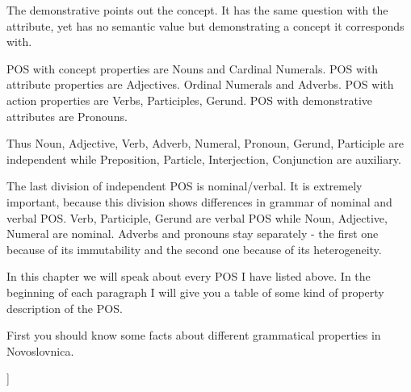 The demonstrative points out the concept. It has the same question with the attribute, yet has no semantic value but demonstrating a concept it corresponds with. 

POS with concept properties are Nouns and Cardinal Numerals. POS with attribute properties are Adjectives. Ordinal Numerals and Adverbs. POS with action properties are Verbs, Participles, Gerund. POS with demonstrative attributes are Pronouns.

Thus Noun, Adjective, Verb, Adverb, Numeral, Pronoun, Gerund, Participle are independent while Preposition, Particle, Interjection, Conjunction are auxiliary.

The last division of independent POS is nominal/verbal. It is extremely important, because this division shows differences in grammar of nominal and verbal POS. Verb, Participle, Gerund are verbal POS while Noun, Adjective, Numeral are nominal. Adverbs and pronouns stay separately - the first one because of its immutability and the second one because of its heterogeneity. 

In this chapter we will speak about every POS I have listed above. In the beginning of each paragraph I will give you a table of some kind of property description of the POS.

First you should know some facts about different grammatical properties in Novoslovnica.








]

